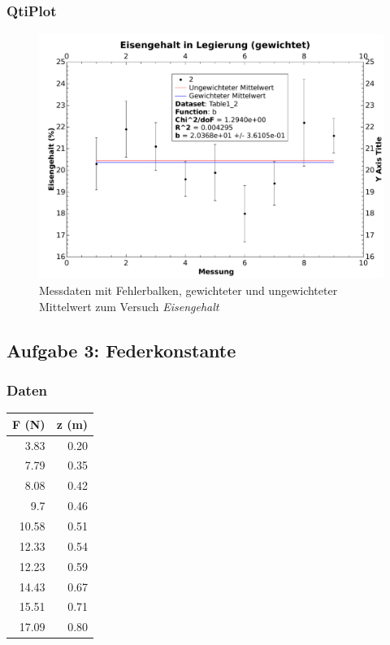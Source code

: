 \clearpage
\subsubsection{QtiPlot}
\begin{figure}[th!]
    \centering
    \includegraphics[width=\textwidth]{images/aufgabe2.pdf}
    \caption{Messdaten mit Fehlerbalken, gewichteter und ungewichteter Mittelwert zum Versuch \emph{Eisengehalt}}
    \label{fig:gauss}
\end{figure}

\clearpage
\subsection{Aufgabe 3: Federkonstante}

\subsubsection{Daten}

\begin{center}
\begin{tabular}{rr}
    \toprule
    F (N) & z (m) \\
    \midrule
    3.83  & 0.20 \\
    7.79  & 0.35 \\
    8.08  & 0.42 \\
    9.7   & 0.46 \\
    10.58 & 0.51 \\
    12.33 & 0.54 \\
    12.23 & 0.59 \\
    14.43 & 0.67 \\
    15.51 & 0.71 \\
    17.09 & 0.80 \\
    \bottomrule
\end{tabular}
\end{center}

